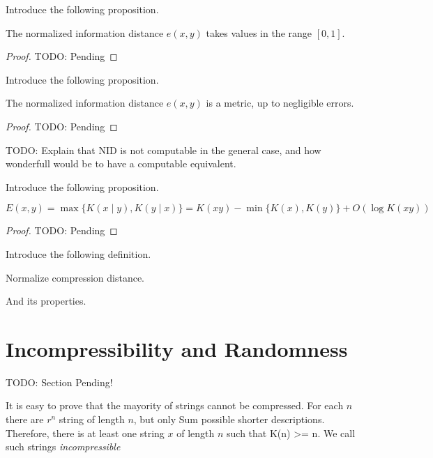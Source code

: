 {\color{red} Introduce the following proposition.}

\begin{proposition}
\label{prop:ncd_between_zero_and_one}
The normalized information distance $e(x, y)$ takes values in the range $[0, 1]$.
\end{proposition}
\begin{proof}
{\color{red} TODO: Pending}
\end{proof}

{\color{red} Introduce the following proposition.}

\begin{proposition}
The normalized information distance $e(x, y)$ is a metric, up to negligible errors.
\end{proposition}
\begin{proof}
{\color{red} TODO: Pending}
\end{proof}

{\color{red} TODO: Explain that NID is not computable in the general case, and how wonderfull would be to have a computable equivalent.}

{\color{red} Introduce the following proposition.}

\begin{proposition}
\[
E(x, y) = \max\{ K(x \mid y), K(y \mid x) \} = K(xy) - \min\{ K(x), K(y) \} + O(\log K(xy) )
\]
\end{proposition}
\begin{proof}
{\color{red} TODO: Pending}
\end{proof}

{\color{red} Introduce the following definition.}

\begin{definition}
Normalize compression distance.
\end{definition}

{\color{red} And its properties.}


%
%

\section{Incompressibility and Randomness}
\label{sec:incompressibility_randomness}

{\color{red} TODO: Section Pending!}

It is easy to prove that the mayority of strings cannot be compressed. For each $n$ there are $r^n$ string of length $n$, but only Sum possible shorter descriptions. Therefore, there is at least one string $x$ of length $n$ such that K(n) >= n. We call such strings \emph{incompressible}

